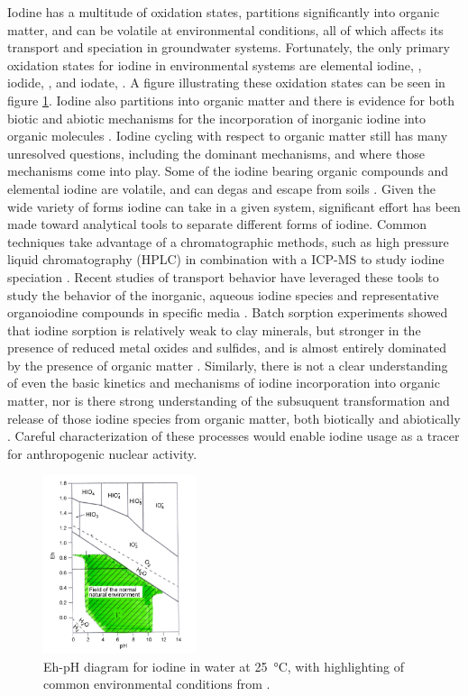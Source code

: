 \documentclass[twoside,12pt,titlepage]{article}
\begin{document}
\par Iodine has a multitude of oxidation states, partitions significantly into organic matter, and can be volatile at environmental conditions, all of which affects its transport and speciation in groundwater systems. Fortunately, the only primary oxidation states for iodine in environmental systems are elemental iodine, , iodide, , and iodate,  \cite{Hou2009}. A figure illustrating these oxidation states can be seen in figure \ref{fig:IodineSpeciation}. Iodine also partitions into organic matter and there is evidence for both biotic and abiotic mechanisms for the incorporation of inorganic iodine into organic molecules \cite{Gilfedder2010, Yamaguchi2008}. Iodine cycling with respect to organic matter still has many unresolved questions, including the dominant mechanisms, and where those mechanisms come into play. Some of the iodine bearing organic compounds and elemental iodine are volatile, and can degas and escape from soils \cite{Hu2009}. Given the wide variety of forms iodine can take in a given system, significant effort has been made toward analytical tools to separate different forms of iodine. Common techniques take advantage of a chromatographic methods, such as high pressure liquid chromatography (HPLC) in combination with a ICP-MS to study iodine speciation \cite{Wuilloud2005}. Recent studies of transport behavior have leveraged these tools to study the behavior of the inorganic, aqueous iodine species and representative organoiodine compounds in specific media \cite{Hu2005}. Batch sorption experiments showed that iodine sorption is relatively weak to clay minerals, but stronger in the presence of reduced metal oxides and sulfides, and is almost entirely dominated by the presence of organic matter \cite{Assemi1994,Fuhrmann1998}. Similarly, there is not a clear understanding of even the basic kinetics and mechanisms of iodine incorporation into organic matter, nor is there strong understanding of the subsuquent transformation and release of those iodine species from organic matter, both biotically and abiotically \cite{Yamaguchi2008,Kaplan2014}. Careful characterization of these processes would enable iodine usage as a tracer for anthropogenic nuclear activity.

\begin{figure}
\centering
\includegraphics[width = 0.4\textwidth]{IodineSpeciation.png}
\caption{Eh-pH diagram for iodine in water at \SI{25}{\degreeCelsius}, with highlighting of common environmental conditions from \cite{Hou2009}.}
\label{fig:IodineSpeciation}
\end{figure}
\end{document}
